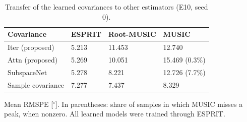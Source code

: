 \begin{table}[h!]
\centering
\small
\caption{Transfer of the learned covariances to other estimators (E10, seed 0).}
\label{tab:pnp}
\begin{tabular}{llll}
\toprule
Covariance & ESPRIT & Root-MUSIC & MUSIC \\
\midrule
Iter (proposed) & 5.213 & 11.453 & 12.740 \\
Attn (proposed) & 5.269 & 10.051 & 15.469 (0.3\%) \\
SubspaceNet & 5.278 & 8.221 & 12.726 (7.7\%) \\
\midrule
Sample covariance & 7.277 & 7.437 & 8.329 \\
\hline
\end{tabular}
\par\smallskip\parbox{0.95\textwidth}{\footnotesize Mean RMSPE [$^\circ$]. In parentheses: share of samples in which MUSIC misses a peak, when nonzero. All learned models were trained through ESPRIT.}
\end{table}
